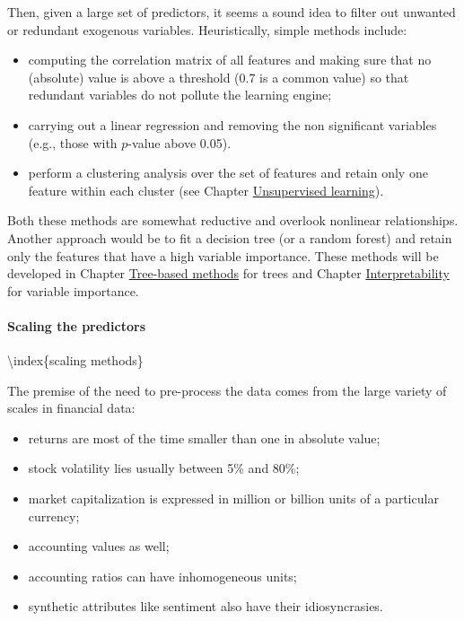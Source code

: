 Then, given a large set of predictors, it seems a sound idea to filter out unwanted or redundant exogenous variables. Heuristically, simple methods include:

\begin{itemize}
\item computing the correlation matrix of all features and making sure that no (absolute) value is above a threshold (0.7 is a common value) so that redundant variables do not pollute the learning engine;
\item carrying out a linear regression and removing the non significant variables (e.g., those with $p$-value above 0.05).
\item perform a clustering analysis over the set of features and retain only one feature within each cluster (see Chapter \href{/chap-21-unsupervised}{Unsupervised learning}).
\end{itemize}

Both these methods are somewhat reductive and overlook nonlinear relationships. Another approach would be to fit a decision tree (or a random forest) and retain only the features that have a high variable importance. These methods will be developed in Chapter \href{/chap-07-trees}{Tree-based methods} for trees and Chapter \href{/chap-19-interpretability}{Interpretability} for variable importance.

\paragraph{Scaling the predictors}\label{scaling}

{\textbackslash}index\{scaling methods\}

The premise of the need to pre-process the data comes from the large variety of scales in financial data:

\begin{itemize}
\item returns are most of the time smaller than one in absolute value;
\item stock volatility lies usually between 5\% and 80\%;
\item market capitalization is expressed in million or billion units of a particular currency;
\item accounting values as well;
\item accounting ratios can have inhomogeneous units;
\item synthetic attributes like sentiment also have their idiosyncrasies.
\end{itemize}

